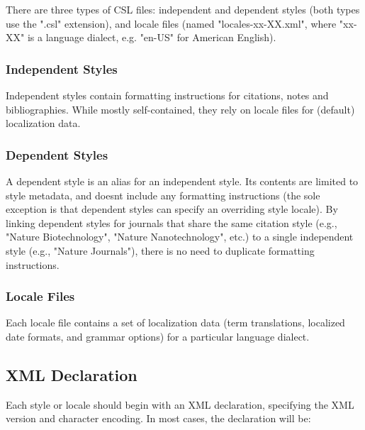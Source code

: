 There are three types of CSL files: independent and dependent styles
(both types use the ".csl" extension), and locale files (named
"locales-xx-XX.xml", where "xx-XX" is a language dialect, e.g. "en-US"
for American English).

\hypertarget{independent-styles}{%
\subsubsection{Independent Styles}\label{independent-styles}}

Independent styles contain formatting instructions for citations, notes
and bibliographies. While mostly self-contained, they rely on locale
files for (default) localization data.

\hypertarget{dependent-styles}{%
\subsubsection{Dependent Styles}\label{dependent-styles}}

A dependent style is an alias for an independent style. Its contents are
limited to style metadata, and doesn\textquotesingle t include any
formatting instructions (the sole exception is that dependent styles can
specify an overriding style locale). By linking dependent styles for
journals that share the same citation style (e.g., "Nature
Biotechnology", "Nature Nanotechnology", etc.) to a single independent
style (e.g., "Nature Journals"), there is no need to duplicate
formatting instructions.

\hypertarget{locale-files}{%
\subsubsection{Locale Files}\label{locale-files}}

Each locale file contains a set of localization data (term translations,
localized date formats, and grammar options) for a particular language
dialect.

\hypertarget{xml-declaration}{%
\subsection{XML Declaration}\label{xml-declaration}}

Each style or locale should begin with an XML declaration, specifying
the XML version and character encoding. In most cases, the declaration
will be:

\begin{Shaded}
\begin{Highlighting}[]
\end{Highlighting}
\end{Shaded}

